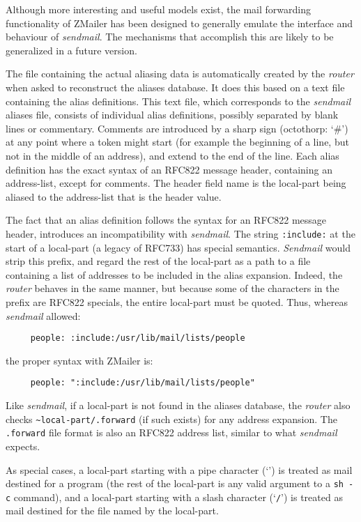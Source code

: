 Although more interesting and useful models exist, the mail forwarding
functionality of ZMailer has been designed to generally emulate the
interface and behaviour of {\em sendmail\/}.  The mechanisms that accomplish this
are likely to be generalized in a future version.

The file containing the actual aliasing data is automatically created by
the {\em router\/} when asked to reconstruct the aliases database.  It does this
based on a text file containing the alias definitions.  This text file,
which corresponds to the {\em sendmail\/} aliases file, consists of individual
alias definitions, possibly separated by blank lines or commentary.
Comments are introduced by a sharp sign (octothorp: `\#') at any point where
a token might start (for example the beginning of a line, but not in the
middle of an address), and extend to the end of the line.  Each alias
definition has the exact syntax of an RFC822 message header, containing an
address-list, except for comments.  The header field name is the local-part
being aliased to the address-list that is the header value.

The fact that an alias definition follows the syntax for an RFC822 message
header, introduces an incompatibility with {\em sendmail\/}.  The string
{\tt :include:} at the start of a local-part (a legacy of RFC733) has special
semantics. {\em Sendmail\/} would strip this prefix, and regard the rest of the
local-part as a path to a file containing a list of addresses to be
included in the alias expansion. Indeed, the {\em router\/} behaves in the same
manner, but because some of the characters in the prefix are RFC822
specials, the entire local-part must be quoted.  Thus, whereas {\em sendmail\/}
allowed:

\begin{verbatim}
     people: :include:/usr/lib/mail/lists/people
\end{verbatim}

the proper syntax with ZMailer is:
\begin{verbatim}
     people: ":include:/usr/lib/mail/lists/people"
\end{verbatim}


Like {\em sendmail\/}, if a local-part is not found in the aliases database, the
{\em router\/} also checks {\tt \~{}local-part/.forward} (if such exists) for 
any address expansion.  The {\tt .forward} file format is also an RFC822 
address list, similar to what {\em sendmail\/} expects.

As special cases, a local-part starting with a pipe character (`{\tt {\verbar}}') is
treated as mail destined for a program (the rest of the local-part is any
valid argument to a {\tt sh -c} command), and a local-part starting with a
slash character (`{\tt /}') is treated as mail destined for the file named 
by the local-part.

